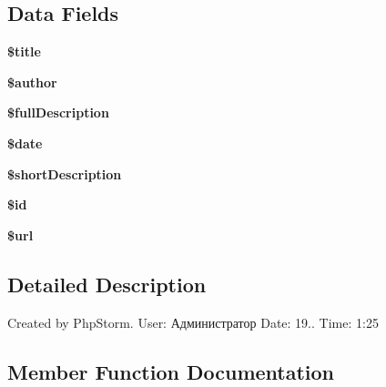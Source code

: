 \subsection*{Data Fields}
\begin{DoxyCompactItemize}
\item 
\hypertarget{class_news_main_ada57e7bb7c152edad18fe2f166188691}{}{\bfseries \$title}\label{class_news_main_ada57e7bb7c152edad18fe2f166188691}

\item 
\hypertarget{class_news_main_ac35b828f7d4064a7c9f849c255468ee3}{}{\bfseries \$author}\label{class_news_main_ac35b828f7d4064a7c9f849c255468ee3}

\item 
\hypertarget{class_news_main_aeca201f5365397f8d49dac59827a17fd}{}{\bfseries \$full\+Description}\label{class_news_main_aeca201f5365397f8d49dac59827a17fd}

\item 
\hypertarget{class_news_main_a481c918f8d853749e00b5942cabf599a}{}{\bfseries \$date}\label{class_news_main_a481c918f8d853749e00b5942cabf599a}

\item 
\hypertarget{class_news_main_a76c586a80213715ad01e3d63bdbba5ce}{}{\bfseries \$short\+Description}\label{class_news_main_a76c586a80213715ad01e3d63bdbba5ce}

\item 
\hypertarget{class_news_main_ae97941710d863131c700f069b109991e}{}{\bfseries \$id}\label{class_news_main_ae97941710d863131c700f069b109991e}

\item 
\hypertarget{class_news_main_acf215f34a917d014776ce684a9ee8909}{}{\bfseries \$url}\label{class_news_main_acf215f34a917d014776ce684a9ee8909}

\end{DoxyCompactItemize}


\subsection{Detailed Description}
Created by Php\+Storm. User\+: Администратор Date\+: 19.. Time\+: 1\+:25 

\subsection{Member Function Documentation}
\hypertarget{class_news_main_af288d56be236ebdb2f34233da9fc5562}{}
